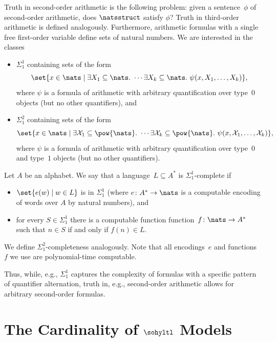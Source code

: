 Truth in second-order arithmetic is the following problem: given a sentence~$\phi$ of second-order arithmetic, does $\natsstruct $ satisfy $\phi$?
Truth in third-order arithmetic is defined analogously.
Furthermore, arithmetic formulas with a single free first-order variable define sets of natural numbers. We are interested in the classes
\begin{itemize}
    \item $\Sigma_1^1$ containing sets of the form
    \[\set{x \in\nats \mid \exists X_1 \subseteq \nats.\ \cdots \exists X_k\subseteq \nats.\ \psi(x, X_1, \ldots,X_k )},\] where $\psi$ is a formula of arithmetic with arbitrary quantification over type~$0$ objects (but no other quantifiers), and
    \item $\Sigma_1^2$ containing sets of the form
    \[
    \set{x \in\nats \mid \exists \mathcal{X}_1\subseteq \pow{\nats}.\ \cdots \exists \mathcal{X}_k\subseteq \pow{\nats}. \ \psi(x, \mathcal{X}_1, \ldots,\mathcal{X}_k)},
    \]
    where $\psi$ is a formula of arithmetic with arbitrary quantification over type~$0$ and type~$1$ objects (but no other quantifiers).
\end{itemize}

Let $A$ be an alphabet.
We say that a language~$L \subseteq A^*$ is $\Sigma_1^1$-complete if 
\begin{itemize}
    \item $\set{e(w) \mid w \in L}$ is in $\Sigma_1^1$ (where $e\colon A^* \rightarrow \nats$ is a computable encoding of words over $A$ by natural numbers), and

    \item for every $S \in \Sigma_1^1$ there is a computable function function~$f\colon \nats \rightarrow A^*$ such that $n \in S$ if and only if $f(n) \in L$.

\end{itemize}
We define $\Sigma_1^2$-completeness analogously.
Note that all encodings~$e$ and functions~$f$ we use are polynomial-time computable.

Thus, while, e.g., $\Sigma_1^1$ captures the complexity of formulas with a specific pattern of quantifier alternation, truth in, e.g., second-order arithmetic allows for arbitrary second-order formulas.

\section{\texorpdfstring{The Cardinality of $\sohyltl$ Models}{The Cardinality of Second-order HyperLTL Models}} 
\label{sec_models}

